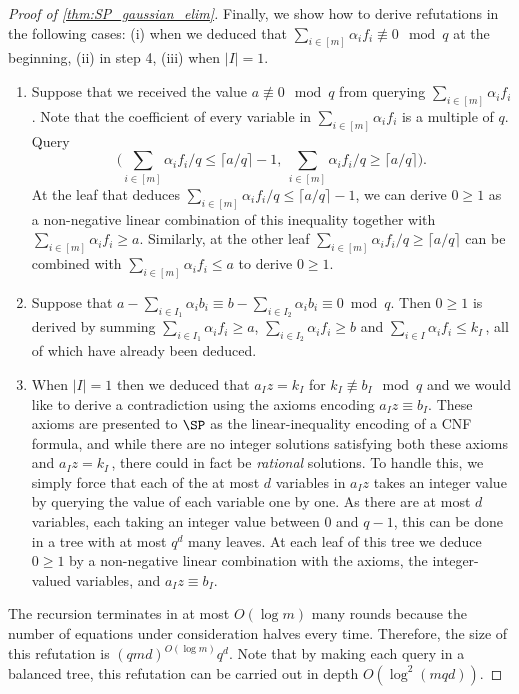 \begin{proof}[Proof of \autoref{thm:SP_gaussian_elim}]
	Finally, we show how to derive refutations in the following cases: (i) when we deduced that $\sum_{i \in [m]} \alpha_i f_i \not \equiv 0 \mod q$ at the beginning, (ii) in step 4, (iii) when $|I| = 1$. 
	\begin{enumerate}
		\item[(i)]	Suppose that we received the value $a \not \equiv 0 \mod q$ from querying $\sum_{i \in [m]} \alpha_i f_i$. Note that the coefficient of every variable in $\sum_{i \in [m]} \alpha_i f_i$ is a multiple of $q$. Query 
	\[\Big(\sum_{i \in [m]} \alpha_i f_i/q \leq \lceil a/q \rceil-1,~ \sum_{i \in [m]} \alpha_i f_i/q \geq \lceil a/q \rceil \Big).\]
	At the leaf that deduces $\sum_{i \in [m]} \alpha_i f_i/q \leq \lceil a/q \rceil-1$, we can derive $0 \geq 1$ as a non-negative linear combination of this inequality together with $\sum_{i \in [m]} \alpha_i f_i \geq a$. Similarly, at the other leaf $\sum_{i \in [m]} \alpha_i f_i/q \geq \lceil a/q \rceil$ can be combined with $\sum_{i \in [m]} \alpha_i f_i \leq a$ to derive $0 \geq 1$.
	\item[(ii)] Suppose that $a -\sum_{i \in I_1} \alpha_i b_i \equiv b -\sum_{i \in I_2} \alpha_i b_i \equiv 0 \bmod q$. Then $0 \geq 1$ is derived by summing $\sum_{i \in I_1} \alpha_i f_i \geq a$, $\sum_{i \in I_2} \alpha_i f_i \geq b$ and $\sum_{i \in I} \alpha_i f_i \leq k_I\,$, all of which have already been deduced.
	\item[(iii)] When $|I| = 1$ then we deduced that $a_I z = k_I$ for $k_I \not \equiv b_I \mod q$ and we would like to derive a contradiction using the axioms encoding $a_I z \equiv b_I$. These axioms are presented to $\SP$ as the linear-inequality encoding of a CNF formula, and while there are no integer solutions satisfying both these axioms and $a_I z = k_I\,$, there could in fact be \emph{rational} solutions. To handle this, we simply force that each of the at most $d$ variables in $a_I z$ takes an integer value by querying the value of each variable one by one. As there are at most $d$ variables, each taking an integer value between $0$ and $q-1$, this can be done in a tree with at most $q^d$ many leaves. At each leaf of this tree we deduce $0 \geq 1$ by a non-negative linear combination with the axioms, the integer-valued variables, and $a_Iz \equiv b_I$. 
	\end{enumerate}
	The recursion terminates in at most $O(\log m)$ many rounds because the number of equations under consideration halves every time. Therefore, the size of this refutation is $(qmd)^{O(\log m)} q^d$. Note that by making each query in a balanced tree, this refutation can be carried out in depth $O(\log^2(mqd))$.
\end{proof}

